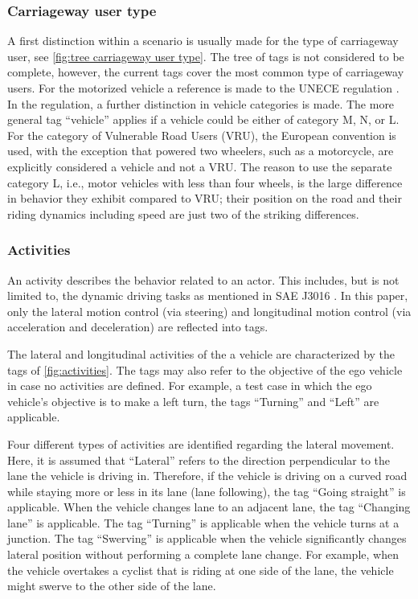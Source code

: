 \documentclass[twoside,twocolumn,9pt]{extarticle}
\theoremstyle{plain}
\begin{document}
\subsubsection{Carriageway user type}
\label{sec:type of actor}

A first distinction within a scenario is usually made for the type of carriageway user, see \cref{fig:tree carriageway user type}. The tree of tags is not considered to be complete, however, the current tags cover the most common type of carriageway users. For the motorized vehicle a reference is made to the UNECE regulation \autocite{UNECE2011consolidated}. In the regulation, a further distinction in vehicle categories is made. The more general tag ``vehicle'' applies if a vehicle could be either of category M, N, or L. For the category of Vulnerable Road Users (VRU), the European convention is used, with the exception that powered two wheelers, such as a motorcycle, are explicitly considered a vehicle and not a VRU. The reason to use the separate category L, i.e., motor vehicles with less than four wheels, is the large difference in behavior they exhibit compared to VRU; their position on the road and their riding dynamics including speed are just two of the striking differences. 



\subsubsection{Activities}
\label{sec:activities}

An activity describes the behavior related to an actor. This includes, but is not limited to, the dynamic driving tasks as mentioned in SAE J3016 \cite{sae2018j3016}. In this paper, only the lateral motion control (via steering) and longitudinal motion control (via acceleration and deceleration) are reflected into tags.

The lateral and longitudinal activities of the a vehicle are characterized by the tags of \cref{fig:activities}. The tags may also refer to the objective of the ego vehicle in case no activities are defined. For example, a test case in which the ego vehicle's objective is to make a left turn, the tags ``Turning'' and ``Left'' are applicable. 


Four different types of activities are identified regarding the lateral movement. Here, it is assumed that ``Lateral'' refers to the direction perpendicular to the lane the vehicle is driving in. Therefore, if the vehicle is driving on a curved road while staying more or less in its lane (lane following), the tag ``Going straight'' is applicable. When the vehicle changes lane to an adjacent lane, the tag ``Changing lane'' is applicable. The tag ``Turning'' is applicable when the vehicle turns at a junction. The tag ``Swerving'' is applicable when the vehicle significantly changes lateral position without performing a complete lane change. For example, when the vehicle overtakes a cyclist that is riding at one side of the lane, the vehicle might swerve to the other side of the lane. 
\end{document}
